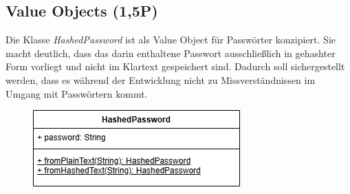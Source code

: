 \subsection{Value Objects (1,5P)}
Die Klasse \textit{HashedPassword} ist als Value Object für Passwörter konzipiert. Sie macht deutlich, dass das darin enthaltene Passwort ausschließlich in gehashter Form vorliegt und nicht im Klartext gespeichert sind. Dadurch soll sichergestellt werden, dass es während der Entwicklung nicht zu Missverständnissen im Umgang mit Passwörtern kommt.
\begin{figure}[htbp]
    \centering
\includegraphics{kapitel6_ddd/valueobject.drawio.png}
\end{figure}
